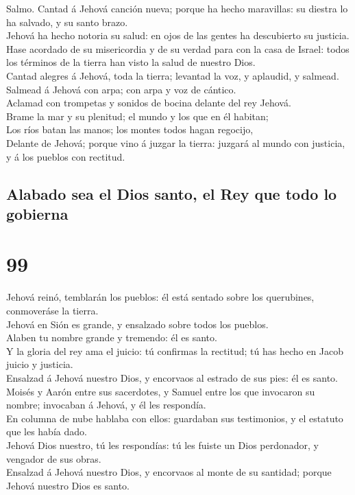  Salmo. Cantad á Jehová canción nueva; porque ha hecho
maravillas: su diestra lo ha salvado, y su santo brazo.\\
 Jehová ha hecho notoria su salud: en ojos de las gentes
ha descubierto su justicia.\\
 Hase acordado de su misericordia y de su verdad para con
la casa de Israel: todos los términos de la tierra han visto la salud de
nuestro Dios.\\
 Cantad alegres á Jehová, toda la tierra; levantad la voz,
y aplaudid, y salmead.\\
 Salmead á Jehová con arpa; con arpa y voz de cántico.\\
 Aclamad con trompetas y sonidos de bocina delante del rey
Jehová.\\
 Brame la mar y su plenitud; el mundo y los que en él
habitan;\\
 Los ríos batan las manos; los montes todos hagan
regocijo,\\
 Delante de Jehová; porque vino á juzgar la tierra:
juzgará al mundo con justicia, y á los pueblos con rectitud.

\hypertarget{alabado-sea-el-dios-santo-el-rey-que-todo-lo-gobierna}{%
\subsection{Alabado sea el Dios santo, el Rey que todo lo
gobierna}\label{alabado-sea-el-dios-santo-el-rey-que-todo-lo-gobierna}}

\hypertarget{section-98}{%
\section{99}\label{section-98}}

 Jehová reinó, temblarán los pueblos: él está sentado
sobre los querubines, conmoveráse la tierra.\\
 Jehová en Sión es grande, y ensalzado sobre todos los
pueblos.\\
 Alaben tu nombre grande y tremendo: él es santo.\\
 Y la gloria del rey ama el juicio: tú confirmas la
rectitud; tú has hecho en Jacob juicio y justicia.\\
 Ensalzad á Jehová nuestro Dios, y encorvaos al estrado de
sus pies: él es santo.\\
 Moisés y Aarón entre sus sacerdotes, y Samuel entre los
que invocaron su nombre; invocaban á Jehová, y él les respondía.\\
 En columna de nube hablaba con ellos: guardaban sus
testimonios, y el estatuto que les había dado.\\
 Jehová Dios nuestro, tú les respondías: tú les fuiste un
Dios perdonador, y vengador de sus obras.\\
 Ensalzad á Jehová nuestro Dios, y encorvaos al monte de
su santidad; porque Jehová nuestro Dios es santo.

